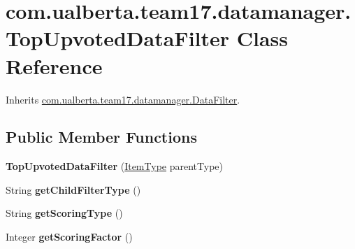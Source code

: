 \hypertarget{classcom_1_1ualberta_1_1team17_1_1datamanager_1_1_top_upvoted_data_filter}{\section{com.\+ualberta.\+team17.\+datamanager.\+Top\+Upvoted\+Data\+Filter Class Reference}
\label{classcom_1_1ualberta_1_1team17_1_1datamanager_1_1_top_upvoted_data_filter}
}


Inherits \hyperlink{classcom_1_1ualberta_1_1team17_1_1datamanager_1_1_data_filter}{com.\+ualberta.\+team17.\+datamanager.\+Data\+Filter}.

\subsection*{Public Member Functions}
\begin{DoxyCompactItemize}
\item 
\hypertarget{classcom_1_1ualberta_1_1team17_1_1datamanager_1_1_top_upvoted_data_filter_aab6008e533b28690a2cee329a336b25b}{{\bfseries Top\+Upvoted\+Data\+Filter} (\hyperlink{enumcom_1_1ualberta_1_1team17_1_1_item_type}{Item\+Type} parent\+Type)}\label{classcom_1_1ualberta_1_1team17_1_1datamanager_1_1_top_upvoted_data_filter_aab6008e533b28690a2cee329a336b25b}

\item 
\hypertarget{classcom_1_1ualberta_1_1team17_1_1datamanager_1_1_top_upvoted_data_filter_a7e48eb8a230e8aa0949339166d7d23d2}{String {\bfseries get\+Child\+Filter\+Type} ()}\label{classcom_1_1ualberta_1_1team17_1_1datamanager_1_1_top_upvoted_data_filter_a7e48eb8a230e8aa0949339166d7d23d2}

\item 
\hypertarget{classcom_1_1ualberta_1_1team17_1_1datamanager_1_1_top_upvoted_data_filter_a2ed3488a4d1734cf1877de3df7e0c19d}{String {\bfseries get\+Scoring\+Type} ()}\label{classcom_1_1ualberta_1_1team17_1_1datamanager_1_1_top_upvoted_data_filter_a2ed3488a4d1734cf1877de3df7e0c19d}

\item 
\hypertarget{classcom_1_1ualberta_1_1team17_1_1datamanager_1_1_top_upvoted_data_filter_a57123b506e7702ff4a2d902ba0ec6c87}{Integer {\bfseries get\+Scoring\+Factor} ()}\label{classcom_1_1ualberta_1_1team17_1_1datamanager_1_1_top_upvoted_data_filter_a57123b506e7702ff4a2d902ba0ec6c87}

\end{DoxyCompactItemize}

